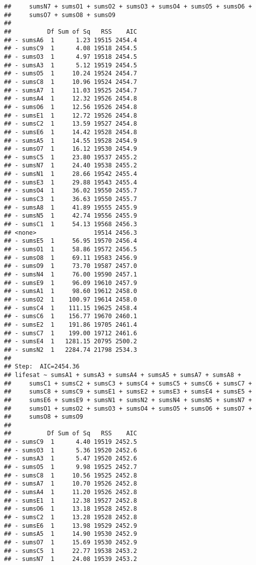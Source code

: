 \documentclass[,man,floatsintext]{apa6}
\begin{document}
\begin{verbatim}
##     sumsN7 + sumsO1 + sumsO2 + sumsO3 + sumsO4 + sumsO5 + sumsO6 + 
##     sumsO7 + sumsO8 + sumsO9
## 
##          Df Sum of Sq   RSS    AIC
## - sumsA6  1      1.23 19515 2454.4
## - sumsC9  1      4.08 19518 2454.5
## - sumsO3  1      4.97 19518 2454.5
## - sumsA3  1      5.12 19519 2454.5
## - sumsO5  1     10.24 19524 2454.7
## - sumsC8  1     10.96 19524 2454.7
## - sumsA7  1     11.03 19525 2454.7
## - sumsA4  1     12.32 19526 2454.8
## - sumsO6  1     12.56 19526 2454.8
## - sumsE1  1     12.72 19526 2454.8
## - sumsC2  1     13.59 19527 2454.8
## - sumsE6  1     14.42 19528 2454.8
## - sumsA5  1     14.55 19528 2454.9
## - sumsO7  1     16.12 19530 2454.9
## - sumsC5  1     23.80 19537 2455.2
## - sumsN7  1     24.40 19538 2455.2
## - sumsN1  1     28.66 19542 2455.4
## - sumsE3  1     29.88 19543 2455.4
## - sumsO4  1     36.02 19550 2455.7
## - sumsC3  1     36.63 19550 2455.7
## - sumsA8  1     41.89 19555 2455.9
## - sumsN5  1     42.74 19556 2455.9
## - sumsC1  1     54.13 19568 2456.3
## <none>                19514 2456.3
## - sumsE5  1     56.95 19570 2456.4
## - sumsO1  1     58.86 19572 2456.5
## - sumsO8  1     69.11 19583 2456.9
## - sumsO9  1     73.70 19587 2457.0
## - sumsN4  1     76.00 19590 2457.1
## - sumsE9  1     96.09 19610 2457.9
## - sumsA1  1     98.60 19612 2458.0
## - sumsO2  1    100.97 19614 2458.0
## - sumsC4  1    111.15 19625 2458.4
## - sumsC6  1    156.77 19670 2460.1
## - sumsE2  1    191.86 19705 2461.4
## - sumsC7  1    199.00 19712 2461.6
## - sumsE4  1   1281.15 20795 2500.2
## - sumsN2  1   2284.74 21798 2534.3
## 
## Step:  AIC=2454.36
## lifesat ~ sumsA1 + sumsA3 + sumsA4 + sumsA5 + sumsA7 + sumsA8 + 
##     sumsC1 + sumsC2 + sumsC3 + sumsC4 + sumsC5 + sumsC6 + sumsC7 + 
##     sumsC8 + sumsC9 + sumsE1 + sumsE2 + sumsE3 + sumsE4 + sumsE5 + 
##     sumsE6 + sumsE9 + sumsN1 + sumsN2 + sumsN4 + sumsN5 + sumsN7 + 
##     sumsO1 + sumsO2 + sumsO3 + sumsO4 + sumsO5 + sumsO6 + sumsO7 + 
##     sumsO8 + sumsO9
## 
##          Df Sum of Sq   RSS    AIC
## - sumsC9  1      4.40 19519 2452.5
## - sumsO3  1      5.36 19520 2452.6
## - sumsA3  1      5.47 19520 2452.6
## - sumsO5  1      9.98 19525 2452.7
## - sumsC8  1     10.56 19525 2452.8
## - sumsA7  1     10.70 19526 2452.8
## - sumsA4  1     11.20 19526 2452.8
## - sumsE1  1     12.38 19527 2452.8
## - sumsO6  1     13.18 19528 2452.8
## - sumsC2  1     13.28 19528 2452.8
## - sumsE6  1     13.98 19529 2452.9
## - sumsA5  1     14.90 19530 2452.9
## - sumsO7  1     15.69 19530 2452.9
## - sumsC5  1     22.77 19538 2453.2
## - sumsN7  1     24.08 19539 2453.2

\end{verbatim}
\end{document}
